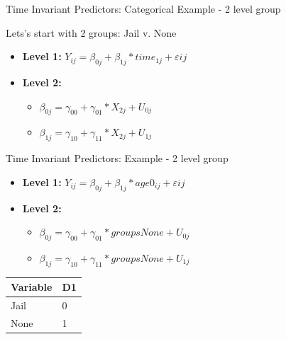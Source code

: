 \documentclass[ignorenonframetext,]{beamer}
\begin{document}
\begin{frame}{Time Invariant Predictors: Categorical Example - 2 level
group}

Lets's start with 2 groups: Jail v. None

\begin{itemize}
  \item \textbf{Level 1:} $Y_{ij} = \beta_{0j} + \beta_{1j}*time_{1j} + \varepsilon{ij}$
  \item \textbf{Level 2:} 
    \begin{itemize} 
      \item $\beta_{0j} = \gamma_{00} + \gamma_{01}*X_{2j} + U_{0j}$
      \item $\beta_{1j} = \gamma_{10} + \gamma_{11}*X_{2j} + U_{1j}$
    \end{itemize}
\end{itemize}

\end{frame}

\begin{frame}{Time Invariant Predictors: Example - 2 level group}

\begin{itemize}
  \item \textbf{Level 1:} $Y_{ij} = \beta_{0j} + \beta_{1j}*age0_{ij} + \varepsilon{ij}$
  \item \textbf{Level 2:} 
    \begin{itemize} 
      \item $\beta_{0j} = \gamma_{00} + \gamma_{01}*groupsNone + U_{0j}$
      \item $\beta_{1j} = \gamma_{10} + \gamma_{11}*groupsNone + U_{1j}$
    \end{itemize}
\end{itemize}

\begin{longtable}[]{@{}ll@{}}
\toprule
Variable & D1\tabularnewline
\midrule
\endhead
Jail & 0\tabularnewline
None & 1\tabularnewline
\bottomrule
\end{longtable}

\end{frame}
\end{document}
